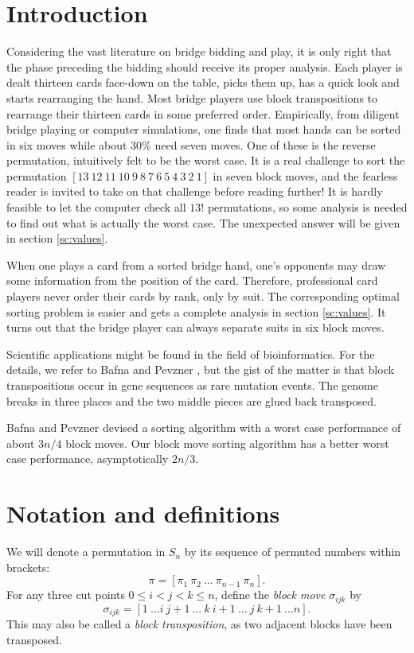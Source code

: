 \documentclass[11pt]{amsart} %
\begin{document}
\section{Introduction}\noindent
Considering the vast literature on bridge bidding and play,
it is only right that the phase preceding the bidding should
receive its proper analysis. Each player is dealt thirteen cards
face-down on the table, picks them up, has a quick look and starts
rearranging the hand. 
Most bridge players use block transpositions to rearrange their
thirteen cards in some preferred order. Empirically, from diligent
bridge playing or computer simulations, one finds that most hands
can be sorted in six moves  while about 30\% need seven moves.
One of these is the reverse permutation, intuitively felt to be
the worst case. It is a real challenge to sort the
permutation $[13\ 12\ 11\ 10\ 9\ 8\ 7\ 6\ 5\ 4\ 3\ 2\ 1]$ in seven
block moves, and the fearless reader is invited to take on that
challenge before reading further! It is hardly feasible to let the
computer check all $13!$ permutations, so some analysis is needed
to find out what is actually the worst case. The unexpected answer
will be given in section \ref{sc:values}.

When one plays a card from a sorted bridge hand, one's opponents may
draw some information from the position of the card.
Therefore, professional card players never order their cards by rank,
only by suit. The corresponding optimal sorting problem is easier and
gets a complete analysis in section  \ref{sc:values}. It turns out that the bridge player can 
always separate suits in six block moves.

Scientific applications might be found in the field of bioinformatics.
For the details, we refer to Bafna and Pevzner \cite{BP}, but the gist of the matter
is that block transpositions occur in gene sequences as rare mutation events.
The genome breaks in three places and the two middle pieces are
glued back transposed. 

Bafna and Pevzner \cite{BP} devised a sorting algorithm with a worst case
performance of about $3n/4$ block moves.
Our block move sorting algorithm has a better worst case performance, 
asymptotically $2n/3$. 

\section{Notation and definitions}
\noindent
We will denote a permutation in $S_n$ by its sequence of permuted
numbers within brackets:
\[
   \pi = [\pi_1\ \pi_2\ \dots\ \pi_{n-1}\ \pi_n].
\]
For any three cut points $0\le i<j<k\le n$, define the {\em
block move} $\sigma_{ijk}$ by
\[
\sigma_{ijk} =
  [1\ \dots i\ j\!+\!1\ \dots\ k\ i\!+\!1\ \dots\ j\
   k\!+\!1\ \dots n].
\]
This may also be called a {\em block transposition}, as two
adjacent blocks have been transposed.
\end{document}
